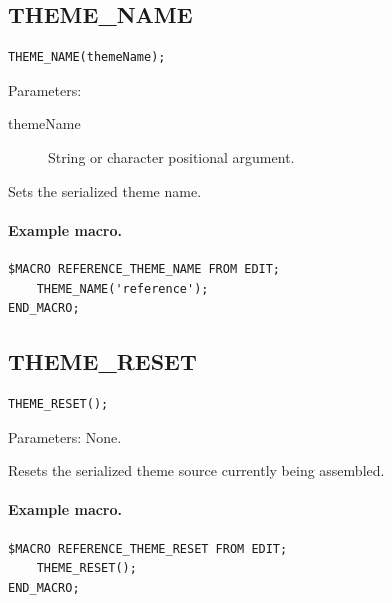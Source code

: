 \documentclass[a4paper,10pt,twoside,openany]{book}
\newenvironment{mrmacextension}{\begin{changebar}}{\end{changebar}}
\begin{document}
\begin{mrmacextension}
\label{prim:procedure-theme-name}
\subsection*{THEME\_NAME}
\begin{verbatim}
THEME_NAME(themeName);
\end{verbatim}
Parameters:
\begin{description}
\item[themeName] String or character positional argument.
\end{description}

Sets the serialized theme name.

\paragraph{Example macro.}
\begin{verbatim}
$MACRO REFERENCE_THEME_NAME FROM EDIT;
    THEME_NAME('reference');
END_MACRO;
\end{verbatim}
\end{mrmacextension}

\begin{mrmacextension}
\label{prim:procedure-theme-reset}
\subsection*{THEME\_RESET}
\begin{verbatim}
THEME_RESET();
\end{verbatim}
Parameters: None.

Resets the serialized theme source currently being assembled.

\paragraph{Example macro.}
\begin{verbatim}
$MACRO REFERENCE_THEME_RESET FROM EDIT;
    THEME_RESET();
END_MACRO;
\end{verbatim}
\end{mrmacextension}
\end{document}
